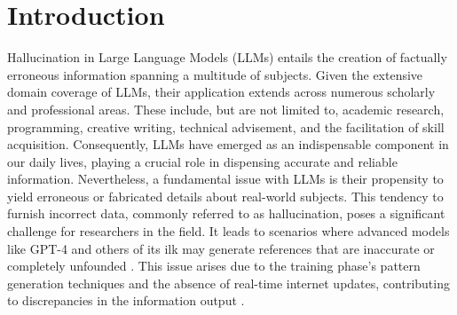 \documentclass[11pt]{article}
\begin{document}
\section{Introduction}
Hallucination in Large Language Models (LLMs) entails the creation of factually erroneous information spanning a multitude of subjects. Given the extensive domain coverage of LLMs, their application extends across numerous scholarly and professional areas. These include, but are not limited to, academic research, programming, creative writing, technical advisement, and the facilitation of skill acquisition. Consequently, LLMs have emerged as an indispensable component in our daily lives, playing a crucial role in dispensing accurate and reliable information. Nevertheless, a fundamental issue with LLMs is their propensity to yield erroneous or fabricated details about real-world subjects. This tendency to furnish incorrect data, commonly referred to as hallucination, poses a significant challenge for researchers in the field. It leads to scenarios where advanced models like GPT-4 and others of its ilk may generate references that are inaccurate or completely unfounded \cite{rawte2023troubling}. This issue arises due to the training phase's pattern generation techniques and the absence of real-time internet updates, contributing to discrepancies in the information output \cite{RAY2023121}.

\end{document}
